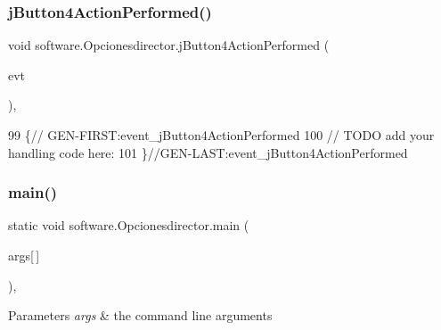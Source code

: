 \subsubsection{\texorpdfstring{j\+Button4\+Action\+Performed()}{jButton4ActionPerformed()}}
{\footnotesize\ttfamily void software.\+Opcionesdirector.\+j\+Button4\+Action\+Performed (\begin{DoxyParamCaption}\item[{java.\+awt.\+event.\+Action\+Event}]{evt }\end{DoxyParamCaption})\hspace{0.3cm}{\ttfamily [inline]}, {\ttfamily [private]}}


\begin{DoxyCode}
99                                                                          \{\textcolor{comment}{//
      GEN-FIRST:event\_jButton4ActionPerformed}
100         \textcolor{comment}{// TODO add your handling code here:}
101     \}\textcolor{comment}{//GEN-LAST:event\_jButton4ActionPerformed}
\end{DoxyCode}
\mbox{\label{classsoftware_1_1_opcionesdirector_a814f46860f6fb87336bd6626ceb23c1a}} 
\subsubsection{\texorpdfstring{main()}{main()}}
{\footnotesize\ttfamily static void software.\+Opcionesdirector.\+main (\begin{DoxyParamCaption}\item[{String}]{args\mbox{[}$\,$\mbox{]} }\end{DoxyParamCaption})\hspace{0.3cm}{\ttfamily [inline]}, {\ttfamily [static]}}


\begin{DoxyParams}{Parameters}
{\em args} & the command line arguments \\
\hline
\end{DoxyParams}

